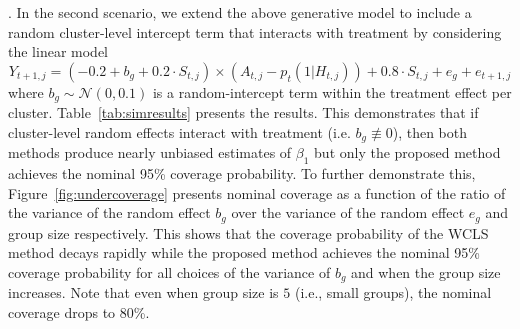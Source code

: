 \documentclass[12pt]{article}
\begin{document}
. In the second scenario, we extend the above generative model to include a random cluster-level intercept term that interacts with treatment by considering the linear model
\begin{equation}
Y_{t+1,j} = (-0.2 + b_g +  0.2 \cdot S_{t,j}) \times (A_{t,j} -p_t(1|H_{t,j})) + 0.8 \cdot S_{t,j} + e_g + e_{t+1,j}
\end{equation}
where $b_g \sim \mathcal{N}(0,0.1)$ is a random-intercept term within the treatment effect per cluster. Table~\ref{tab:simresults} presents the results.  This demonstrates that if cluster-level random effects interact with treatment  (i.e. $b_g \not \equiv 0$), then both methods produce nearly unbiased estimates of $\beta_1$ but only the proposed method achieves the nominal 95\% coverage probability. To further demonstrate this, Figure~\ref{fig:undercoverage} presents nominal coverage as a function of the ratio of the variance of the random effect $b_g$ over the variance of the random effect $e_g$ and group size respectively.  This shows that the coverage probability of the WCLS method decays rapidly while the proposed method achieves the nominal 95\% coverage probability for all choices of the variance of $b_g$ and when the group size increases.  Note that even when group size is $5$ (i.e., small groups), the nominal coverage drops to 80\%.
\end{document}
